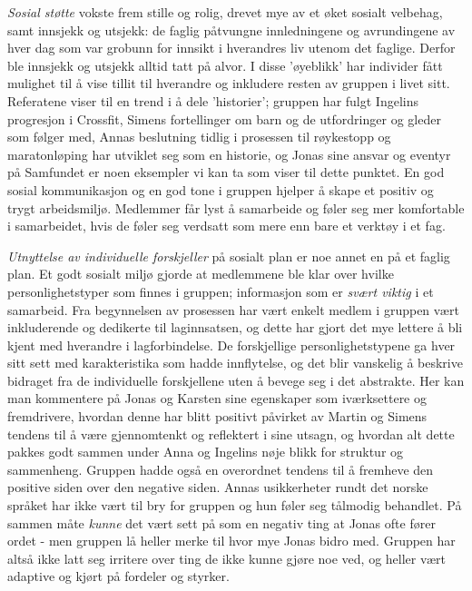 \emph{Sosial støtte} vokste frem stille og rolig, drevet mye av et øket sosialt velbehag, samt innsjekk og utsjekk: de faglig påtvungne innledningene og avrundingene av hver dag som var grobunn for innsikt i hverandres liv utenom det faglige. Derfor ble innsjekk og utsjekk alltid tatt på alvor. I disse 'øyeblikk' har individer fått mulighet til å vise tillit til hverandre og inkludere resten av gruppen i livet sitt. Referatene viser til en trend i å dele 'historier'; gruppen har fulgt Ingelins progresjon i Crossfit, Simens fortellinger om barn og de utfordringer og gleder som følger med, Annas beslutning tidlig i prosessen til røykestopp og maratonløping har utviklet seg som en historie, og Jonas sine ansvar og eventyr på Samfundet er noen eksempler vi kan ta som viser til dette punktet. En god sosial kommunikasjon og en god tone i gruppen hjelper å skape et positiv og trygt arbeidsmiljø\cite{happy}. Medlemmer får lyst å samarbeide og føler seg mer komfortable i samarbeidet, hvis de føler seg verdsatt som mere enn bare et verktøy i et fag.

\emph{Utnyttelse av individuelle forskjeller} på sosialt plan er noe annet en på et faglig plan. Et godt sosialt miljø gjorde at medlemmene ble klar over hvilke personlighetstyper som finnes i gruppen; informasjon som er \emph{svært viktig} i et samarbeid. Fra begynnelsen av prosessen har vært enkelt medlem i gruppen vært inkluderende og dedikerte til laginnsatsen, og dette har gjort det mye lettere å bli kjent med hverandre i lagforbindelse. De forskjellige personlighetstypene ga hver sitt sett med karakteristika som hadde innflytelse, og det blir vanskelig å beskrive bidraget fra de individuelle forskjellene uten å bevege seg i det abstrakte. Her kan man kommentere på Jonas og Karsten sine egenskaper som iværksettere og fremdrivere, hvordan denne har blitt positivt påvirket av Martin og Simens tendens til å være gjennomtenkt og reflektert i sine utsagn, og hvordan alt dette pakkes godt sammen under Anna og Ingelins nøje blikk for struktur og sammenheng. Gruppen hadde også en overordnet tendens til å fremheve den positive siden over den negative siden. Annas usikkerheter rundt det norske språket har ikke vært til bry for gruppen og hun føler seg tålmodig behandlet. På sammen måte \emph{kunne} det vært sett på som en negativ ting at Jonas ofte fører ordet - men gruppen lå heller merke til hvor mye Jonas bidro med. Gruppen har altså ikke latt seg irritere over ting de ikke kunne gjøre noe ved, og heller vært adaptive og kjørt på fordeler og styrker. 